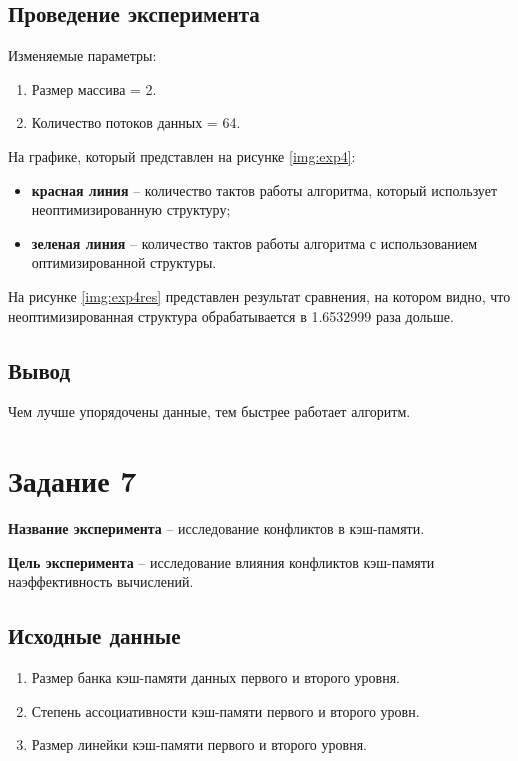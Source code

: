 \subsection{Проведение эксперимента}

Изменяемые параметры:
\begin{enumerate}
	\item Размер массива = 2.
	\item Количество потоков данных = 64.
\end{enumerate}

На графике, который представлен на рисунке \ref{img:exp4}:
\begin{itemize}
    \item \textbf{красная линия} -- количество тактов работы алгоритма, который
        использует неоптимизированную структуру;
    \item \textbf{зеленая линия} -- количество тактов работы алгоритма с
        использованием оптимизированной структуры.
\end{itemize}



На рисунке \ref{img:exp4res} представлен результат сравнения, на котором видно,
что неоптимизированная структура обрабатывается в 1.6532999 раза дольше.

\subsection{Вывод}
Чем лучше упорядочены данные, тем быстрее работает алгоритм.

\section{Задание 7}

\textbf{Название эксперимента} -- исследование конфликтов в кэш-памяти.

\textbf{Цель эксперимента} -- исследование влияния конфликтов кэш-памяти
наэффективность вычислений.

\subsection{Исходные данные}
\begin{enumerate}
	\item Размер банка кэш-памяти данных первого и второго уровня.
	\item Степень ассоциативности кэш-памяти первого и второго уровн.
	\item Размер линейки кэш-памяти первого и второго уровня.
\end{enumerate}

